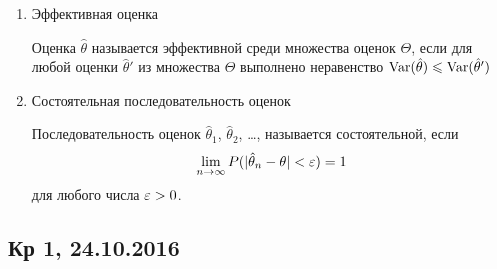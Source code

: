 \documentclass[12pt, a4paper]{article}
\theoremstyle{definition}
\begin{document}
\begin{enumerate}
\begin{enumerate}
\item Эффективная оценка

Оценка $\hat \theta$ называется эффективной среди множества оценок $\Theta$, если для любой оценки $\hat \theta'$ из множества $\Theta$ выполнено неравенство $\operatorname{Var}(\hat \theta) \leqslant \operatorname{Var}(\hat \theta')$

\item Состоятельная последовательность оценок

Последовательность оценок $\hat \theta_1$, $\hat \theta_2$, \ldots, называется состоятельной, если
\[
\lim_{n\to\infty} P(|\hat \theta_n - \theta| < \varepsilon) = 1
\]
для любого числа $\varepsilon >0$.

\end{enumerate}
\end{enumerate}





\subsection{Кр 1, 24.10.2016}


%




\end{document}
